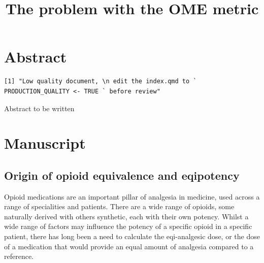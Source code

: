 \documentclass[
  letterpaper,
  DIV=11,
  numbers=noendperiod]{scrreprt}
\title{The problem with the OME metric}
\author{}
\date{}
\renewcommand*\contentsname{Table of contents}
\newcommand\contentsname{Table of contents}
\begin{document}
\maketitle

\renewcommand*\contentsname{Table of contents}
{
\hypersetup{linkcolor=}
\setcounter{tocdepth}{2}
\tableofcontents
}


\chapter*{Abstract}\label{abstract}


\begin{tcolorbox}[enhanced jigsaw, toprule=.15mm, titlerule=0mm, colframe=quarto-callout-note-color-frame, bottomrule=.15mm, colback=white, opacitybacktitle=0.6, coltitle=black, arc=.35mm, colbacktitle=quarto-callout-note-color!10!white, rightrule=.15mm, opacityback=0, breakable, title=\textcolor{quarto-callout-note-color}{\faInfo}\hspace{0.5em}{Note}, left=2mm, toptitle=1mm, leftrule=.75mm, bottomtitle=1mm]

\begin{verbatim}
[1] "Low quality document, \n edit the index.qmd to ` PRODUCTION_QUALITY <- TRUE ` before review"
\end{verbatim}

\end{tcolorbox}

Abstract to be written


\chapter{Manuscript}\label{manuscript}

\section{Origin of opioid equivalence and
eqipotency}\label{origin-of-opioid-equivalence-and-eqipotency}

Opioid medications are an important pillar of analgesia in medicine,
used across a range of specialities and patients. There are a wide range
of opioids, some naturally derived with others synthetic, each with
their own potency. Whilst a wide range of factors may influence the
potency of a specific opioid in a specific patient, there has long been
a need to calculate the eqi-analgesic dose, or the dose of a medication
that would provide an equal amount of analgesia compared to a reference.
\end{document}

